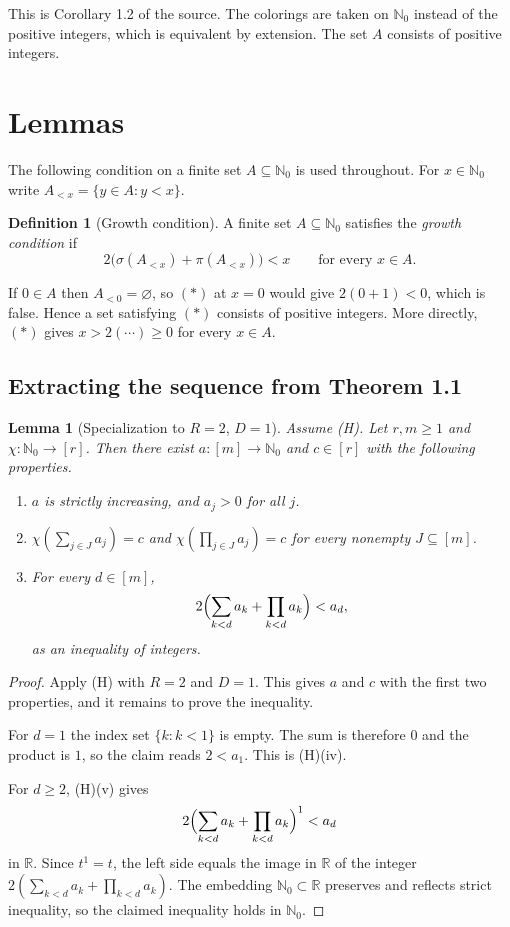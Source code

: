 \documentclass[11pt]{article}
\newtheorem{lemma}[theorem]{Lemma}
\theoremstyle{definition}
\newtheorem{definition}[theorem]{Definition}
\theoremstyle{remark}
\newcommand{\Nz}{\mathbb{N}_0}
\begin{document}
This is Corollary 1.2 of the source. The colorings are taken on $\Nz$ instead of the positive integers, which is equivalent by extension. The set $A$ consists of positive integers.

\section{Lemmas}

The following condition on a finite set $A\subseteq\Nz$ is used throughout. For $x\in\Nz$ write $A_{<x}=\{y\in A:y<x\}$.

\begin{definition}[Growth condition]\label{def:growth}
A finite set $A\subseteq\Nz$ satisfies the \emph{growth condition} if
\[
2\bigl(\sigma(A_{<x})+\pi(A_{<x})\bigr)<x\qquad\text{for every }x\in A. \tag{$\ast$}
\]
\end{definition}

If $0\in A$ then $A_{<0}=\varnothing$, so $(\ast)$ at $x=0$ would give $2(0+1)<0$, which is false. Hence a set satisfying $(\ast)$ consists of positive integers. More directly, $(\ast)$ gives $x>2(\cdots)\ge0$ for every $x\in A$.

\subsection{Extracting the sequence from Theorem 1.1}

\begin{lemma}[Specialization to $R=2$, $D=1$]\label{lem:hfs_extract}
Assume (H). Let $r,m\ge1$ and $\chi:\Nz\to[r]$. Then there exist $a:[m]\to\Nz$ and $c\in[r]$ with the following properties.
\begin{enumerate}
\item $a$ is strictly increasing, and $a_j>0$ for all $j$.
\item $\chi(\sum_{j\in J}a_j)=c$ and $\chi(\prod_{j\in J}a_j)=c$ for every nonempty $J\subseteq[m]$.
\item For every $d\in[m]$,
\[
2\Bigl(\sum_{k<d}a_k+\prod_{k<d}a_k\Bigr)<a_d,
\]
as an inequality of integers.
\end{enumerate}
\end{lemma}

\begin{proof}
Apply (H) with $R=2$ and $D=1$. This gives $a$ and $c$ with the first two properties, and it remains to prove the inequality.

For $d=1$ the index set $\{k:k<1\}$ is empty. The sum is therefore $0$ and the product is $1$, so the claim reads $2<a_1$. This is (H)(iv).

For $d\ge2$, (H)(v) gives
\[
2\Bigl(\sum_{k<d}a_k+\prod_{k<d}a_k\Bigr)^{1}<a_d
\]
in $\mathbb R$. Since $t^1=t$, the left side equals the image in $\mathbb R$ of the integer $2(\sum_{k<d}a_k+\prod_{k<d}a_k)$. The embedding $\Nz\subset\mathbb R$ preserves and reflects strict inequality, so the claimed inequality holds in $\Nz$.
\end{proof}
\end{document}
